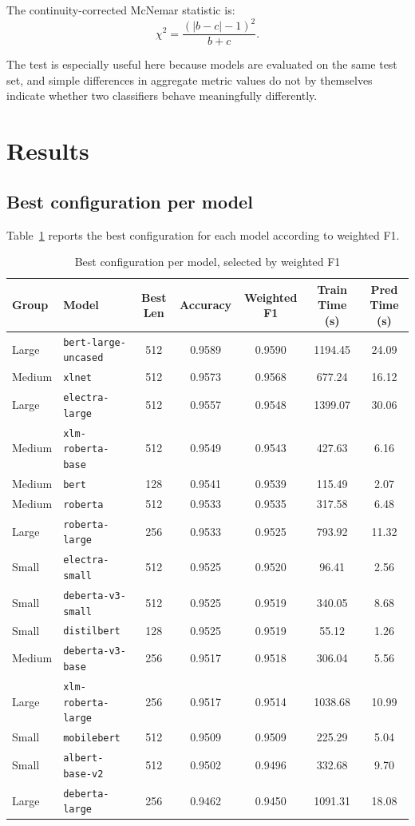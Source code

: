 \documentclass[11pt]{article}
\begin{document}
The continuity-corrected McNemar statistic is:
\[
\chi^2 = \frac{(|b-c|-1)^2}{b+c}.
\]

The test is especially useful here because models are evaluated on the same test set, and simple differences in aggregate metric values do not by themselves indicate whether two classifiers behave meaningfully differently.

\section{Results}

\subsection{Best configuration per model}

Table~\ref{tab:best-per-model} reports the best configuration for each model according to weighted F1. 

\begin{table}[H]
\centering
\caption{Best configuration per model, selected by weighted F1}
\label{tab:best-per-model}
\small
\begin{tabular}{llccccc}
\toprule
Group & Model & Best Len & Accuracy & Weighted F1 & Train Time (s) & Pred Time (s) \\
\midrule
Large & \texttt{bert-large-uncased} & 512 & 0.9589 & 0.9590 & 1194.45 & 24.09 \\
Medium & \texttt{xlnet} & 512 & 0.9573 & 0.9568 & 677.24 & 16.12 \\
Large & \texttt{electra-large} & 512 & 0.9557 & 0.9548 & 1399.07 & 30.06 \\
Medium & \texttt{xlm-roberta-base} & 512 & 0.9549 & 0.9543 & 427.63 & 6.16 \\
Medium & \texttt{bert} & 128 & 0.9541 & 0.9539 & 115.49 & 2.07 \\
Medium & \texttt{roberta} & 512 & 0.9533 & 0.9535 & 317.58 & 6.48 \\
Large & \texttt{roberta-large} & 256 & 0.9533 & 0.9525 & 793.92 & 11.32 \\
Small & \texttt{electra-small} & 512 & 0.9525 & 0.9520 & 96.41 & 2.56 \\
Small & \texttt{deberta-v3-small} & 512 & 0.9525 & 0.9519 & 340.05 & 8.68 \\
Small & \texttt{distilbert} & 128 & 0.9525 & 0.9519 & 55.12 & 1.26 \\
Medium & \texttt{deberta-v3-base} & 256 & 0.9517 & 0.9518 & 306.04 & 5.56 \\
Large & \texttt{xlm-roberta-large} & 256 & 0.9517 & 0.9514 & 1038.68 & 10.99 \\
Small & \texttt{mobilebert} & 512 & 0.9509 & 0.9509 & 225.29 & 5.04 \\
Small & \texttt{albert-base-v2} & 512 & 0.9502 & 0.9496 & 332.68 & 9.70 \\
Large & \texttt{deberta-large} & 256 & 0.9462 & 0.9450 & 1091.31 & 18.08 \\
\bottomrule
\end{tabular}
\end{table}
\end{document}
